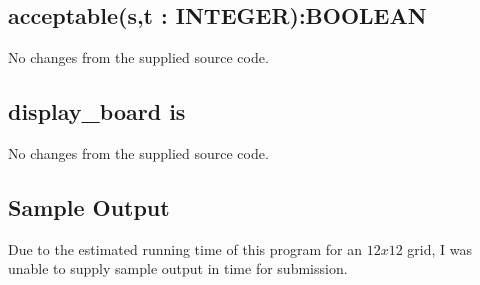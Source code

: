 \documentclass[a4paper,12pt]{article}
\begin{document}
\subsection{acceptable(s,t : INTEGER):BOOLEAN}

No changes from the supplied source code.

\subsection{display\_board is}

No changes from the supplied source code.

\subsection{Sample Output}

Due to the estimated running time of this program for an $12 x 12$ grid,
I was unable to supply sample output in time for submission.
\end{document}
